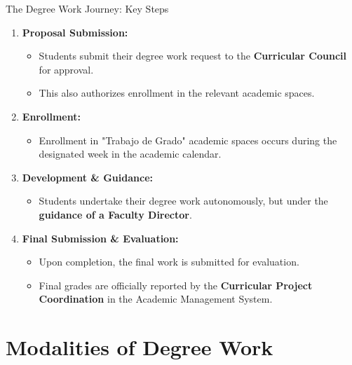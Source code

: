 
    \begin{frame}{The Degree Work Journey: Key Steps}
      \begin{enumerate}
        \item<1-> \textbf{Proposal Submission:}
          \begin{itemize}
            \item<2-> Students submit their degree work request to the \textbf{Curricular Council} for approval.
            \item<3-> This also authorizes enrollment in the relevant academic spaces.
          \end{itemize}
        \item<4-> \textbf{Enrollment:}
          \begin{itemize}
            \item<5-> Enrollment in "Trabajo de Grado" academic spaces occurs during the designated week in the academic calendar.
          \end{itemize}
        \item<6-> \textbf{Development \& Guidance:}
          \begin{itemize}
            \item<7-> Students undertake their degree work autonomously, but under the \textbf{guidance of a Faculty Director}.
          \end{itemize}
        \item<8-> \textbf{Final Submission \& Evaluation:}
          \begin{itemize}
            \item<9-> Upon completion, the final work is submitted for evaluation.
            \item<10-> Final grades are officially reported by the \textbf{Curricular Project Coordination} in the Academic Management System.
          \end{itemize}
      \end{enumerate}
    \end{frame}

    \section{Modalities of Degree Work}



